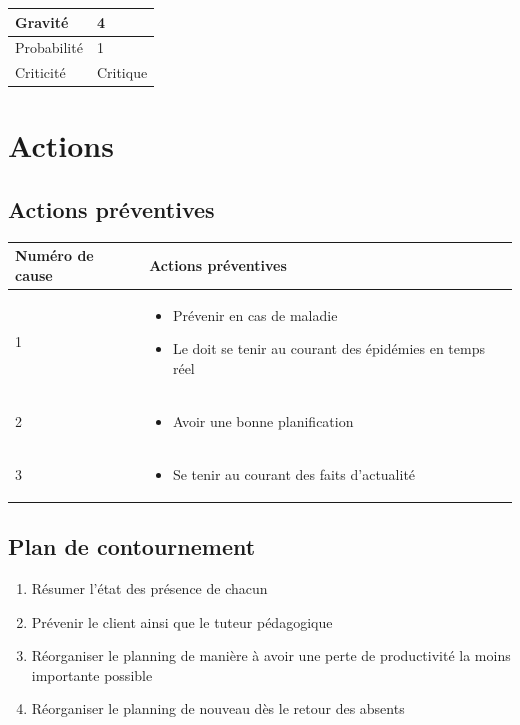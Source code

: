 \begin{table}[h]
\centering
	\begin{tabularx}{12.8cm}{|>{}X|X|}
	\hline
	Gravité & 4\\
	\hline
	Probabilité & 1\\
	\hline
	Criticité & Critique\\
	\hline
	\end{tabularx}
\end{table}
\newpage

\section*{Actions}
\subsection*{Actions préventives}

\centering
	\begin{longtable}{|p{7cm}|p{7cm}|}
	\hline
	Numéro de cause & Actions préventives \\
	\hline
	 1 & \begin{itemize}
	 	\item Prévenir en cas de maladie
	 	\item Le \CP doit se tenir au courant des épidémies en temps réel
	 \end{itemize} \\

	\hline
	2 & \begin{itemize}
		\item Avoir une bonne planification
	\end{itemize} \\
	\hline
	3 & \begin{itemize}
		\item Se tenir au courant des faits d'actualité
	\end{itemize} \\
	\hline
	\end{longtable}

\flushleft
\subsection*{Plan de contournement}

\begin{enumerate}
	\item Résumer l'état des présence de chacun
	\item Prévenir le client ainsi que le tuteur pédagogique
	\item Réorganiser le planning de manière à avoir une perte de productivité la moins importante possible
	\item Réorganiser le planning de nouveau dès le retour des absents
\end{enumerate}

